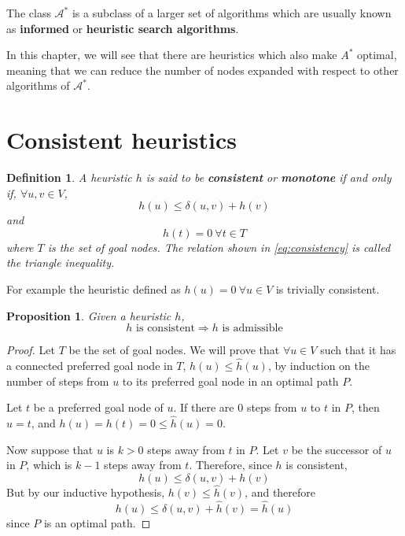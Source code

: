\documentclass[a4paper,10pt]{report}
\newtheorem{definition}[theorem]{Definition}
\newtheorem{proposition}[theorem]{Proposition}
\begin{document}
The class $\mathcal{A^*}$ is a subclass of a larger set of algorithms which are usually known as \textbf{informed} or \textbf{heuristic search algorithms}.

In this chapter, we will see that there are heuristics which also make $A^*$ optimal, meaning that we can reduce the number of nodes expanded with respect to other algorithms of $\mathcal{A^*}$.

\section{Consistent heuristics}

\begin{definition}
A heuristic $h$ is said to be \textbf{consistent} or \textbf{monotone} if and only if, $\forall u, v \in V$,
\begin{equation}
	h(u) \leq \delta(u, v) + h(v)\label{eq:consistency}
\end{equation}
and
\begin{equation}
	h(t) = 0 \  \forall t \in T
\end{equation}
where $T$ is the set of goal nodes.
The relation shown in \ref{eq:consistency} is called the triangle inequality.
\end{definition}

For example the heuristic defined as $h(u) = 0 \  \forall u \in V$ is trivially consistent.

\begin{proposition}
\label{prop:consistent}
Given a heuristic $h$,
\[ h \text{ is consistent} \Rightarrow h \text{ is admissible} \]
\end{proposition}
\begin{proof}
Let $T$ be the set of goal nodes. We will prove that $\forall u \in V$ such that it has a connected preferred goal node in $T$, $h(u) \leq \hat{h}(u)$, by induction on the number of steps from $u$ to its preferred goal node in an optimal path $P$.

Let $t$ be a preferred goal node of $u$. If there are 0 steps from $u$ to $t$ in $P$, then $u = t$, and $h(u) = h(t) = 0 \leq \hat{h}(u) = 0$.

Now suppose that $u$ is $k > 0$ steps away from $t$ in $P$. Let $v$ be the successor of $u$ in $P$, which is $k-1$ steps away from $t$. Therefore, since $h$ is consistent,
\[ h(u) \leq \delta(u, v) + h(v) \]
But by our inductive hypothesis, $h(v) \leq \hat{h}(v)$, and therefore
\[ h(u) \leq \delta(u, v) + \hat{h}(v) = \hat{h}(u) \]
since $P$ is an optimal path.
\end{proof}
\end{document}

